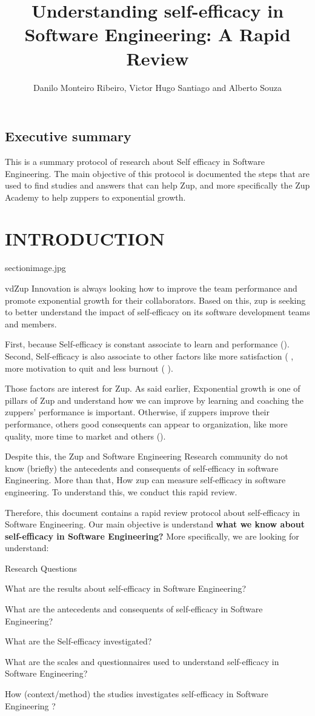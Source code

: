 \documentclass{TheMartianReport}
\title{Understanding self-efficacy in Software Engineering: A Rapid Review } %
\author{Danilo Monteiro Ribeiro, Victor Hugo Santiago and Alberto Souza } %
\begin{document}

\subsection{Executive summary}
This is a summary protocol of research about Self efficacy in Software Engineering. The main objective of this protocol is documented the steps that are used to find studies and answers that can help Zup, and more specifically the Zup Academy to help zuppers to exponential growth.  

\section{INTRODUCTION}{sectionimage.jpg}

vdZup Innovation is always looking how to improve the team performance and promote exponential growth for their collaborators. Based on this, zup is seeking to better understand the impact of self-efficacy on its software development teams and members.

 First, because Self-efficacy is constant associate to learn and performance (\cite{bandura1999self}). Second, Self-efficacy is also associate to other factors like more satisfaction ( \cite{domenech2017self}, more motivation to quit and less burnout ( \cite{federici2012principal}).

Those factors are interest for Zup.
As said earlier, Exponential growth is one of pillars of Zup and understand how we can improve by learning and coaching the zuppers' performance is important. Otherwise, if zuppers improve their performance, others good consequents can appear to organization, like more quality, more time to market and others (\cite{bandura2000cultivate}).

Despite this, the Zup and Software Engineering Research community do not know (briefly)  the antecedents and consequents of self-efficacy in software Engineering. More than that, How zup can measure self-efficacy in software engineering. To understand this, we conduct this rapid review. 

Therefore, this document contains a rapid review protocol about self-efficacy in Software Engineering. Our main objective is understand \textbf{what we know about self-efficacy in Software Engineering?} More specifically, we are looking for understand:
 
\begin{nicelist}{Research Questions}
\item What are the results about self-efficacy in Software Engineering?
\item What are the antecedents and consequents of self-efficacy in Software Engineering?  
\item What are the Self-efficacy investigated? 
\item What are the scales and questionnaires used to understand self-efficacy in Software Engineering? 
\item How (context/method) the studies investigates self-efficacy in Software Engineering ?
\end{nicelist}
\end{document}
